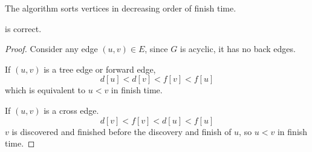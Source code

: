 The algorithm sorts vertices in decreasing order of finish time.

\begin{theorem}
     is correct.
\end{theorem}

\begin{proof}
    Consider any edge $(u,v) \in E$, since $G$ is acyclic, it has no back edges.

    If $(u,v)$ is a tree edge or forward edge,
    $$
    d[u] < d[v] < f[v] < f[u]
    $$
    which is equivalent to $u < v$ in finish time.

    If $(u,v)$ is a cross edge.
    $$
    d[v] < f[v] < d[u] < f[u]
    $$
    $v$ is discovered and finished before the discovery and finish of $u$, so $u < v$ in finish time.
\end{proof}